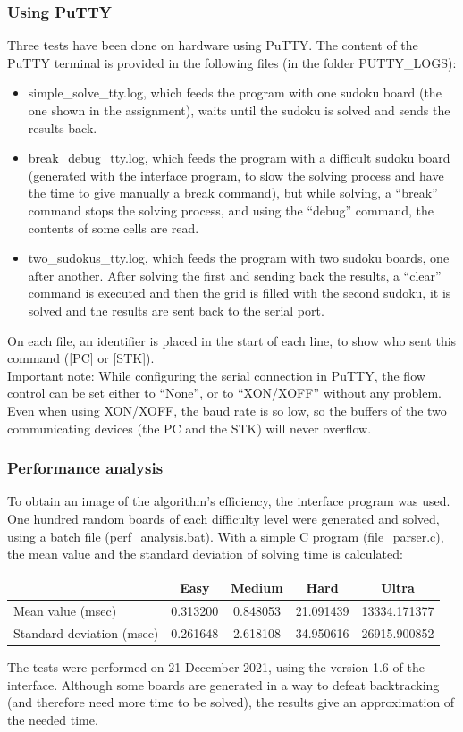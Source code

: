 \documentclass[12pt, a4, hidelinks]{article}
\begin{document}
\subsubsection*{Using PuTTY}
Three tests have been done on hardware using PuTTY. The content of the PuTTY terminal is provided in the following files (in the folder PUTTY\_LOGS):
\begin{itemize}
\item simple\_solve\_tty.log, which feeds the program with one sudoku board (the one shown in the assignment), waits until the sudoku is solved and sends the results back.
\item break\_debug\_tty.log, which feeds the program with a difficult sudoku board (generated with the interface program, to slow the solving process and have the time to give manually a break command), but while solving, a ``break'' command stops the solving process, and using the ``debug'' command, the contents of some cells are read.
\item two\_sudokus\_tty.log, which feeds the program with two sudoku boards, one after another. After solving the first and sending back the results, a ``clear'' command is executed and then the grid is filled with the second sudoku, it is solved and the results are sent back to the serial port.
\end{itemize}
On each file, an identifier is placed in the start of each line, to show who sent this command ([PC] or [STK]).\\
Important note: While configuring the serial connection in PuTTY, the flow control can be set either to ``None'', or to ``XON/XOFF'' without any problem. Even when using XON/XOFF, the baud rate is so low, so the buffers of the two communicating devices (the PC and the STK) will never overflow.

\subsubsection*{Performance analysis}
To obtain an image of the algorithm's efficiency, the interface program was used. One hundred random boards of each difficulty level were generated and solved, using a batch file (perf\_analysis.bat). With a simple C program (file\_parser.c), the mean value and the standard deviation of solving time is calculated:
\begin{center}
\begin{tabular}{ |l|c|c|c|c| } 
 \hline
                                      & Easy         & Medium & Hard & Ultra  \\  \hline
Mean value (msec)           &  0.313200  &  0.848053   &  21.091439       &  13334.171377       \\ \hline
Standard deviation (msec) &  0.261648  & 2.618108   & 34.950616       &  26915.900852         \\ \hline
\end{tabular}
\end{center}
\noindent The tests were performed on 21 December 2021, using the version 1.6 of the interface. Although some boards are generated in a way to defeat backtracking (and therefore need more time to be solved), the results give an approximation of the needed time.
\end{document}
